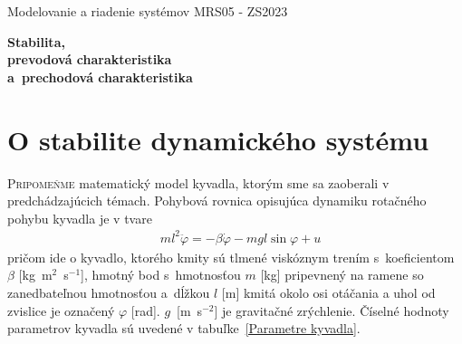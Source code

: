 \documentclass[a4paper, 10pt, ]{article}
\def\oznacenieCasti{MRS05 - ZS2023}
\begin{document}
\lstset{%
style=mystyle,
rangebeginprefix=\#\#\#\ cellB\ ,%
rangebeginsuffix=\ \#\#\#,%
rangeendprefix=\#\#\#\ cellE\ ,%
rangeendsuffix=\ \#\#\#,%
includerangemarker=false,
}




\fontsize{12pt}{22pt}\selectfont

\centerline{\textsf{Modelovanie a riadenie systémov} \hfill \textsf{\oznacenieCasti}}

\fontsize{18pt}{22pt}\selectfont






\begin{flushleft}
	\textbf{\textsf{Stabilita,\\prevodová charakteristika\\a~prechodová charakteristika}}
\end{flushleft}





\normalsize

\bigskip

{\hypersetup{hidelinks}

\tableofcontents

}

\bigskip

\vspace{18pt}





\pagebreak

\section{O stabilite dynamického systému}

\lettrine[lines=3, nindent=0pt]{P}{ripomeňme}
matematický model kyvadla, ktorým sme sa zaoberali v predchádzajúcich témach.
Pohybová rovnica opisujúca dynamiku rotačného pohybu kyvadla je v tvare
\begin{align} \label{PohRovKyvadla} %
		&ml^2 \ddot{\varphi} = -\beta \dot{\varphi} - mgl\sin{\varphi} + u
\end{align}
pričom ide o kyvadlo, ktorého kmity sú tlmené viskóznym trením s~koeficientom $\beta$ [kg~m$^2$~s$^{-1}$], hmotný bod s~hmotnosťou $m$ [kg] pripevnený na ramene so zanedbateľnou hmotnosťou a~dĺžkou $l$ [m] kmitá okolo osi otáčania a uhol od zvislice je označený $\varphi$ [rad]. $g$~[m~s$^{-2}$] je gravitačné zrýchlenie. Číselné hodnoty parametrov kyvadla sú uvedené v tabuľke~\ref{Parametre kyvadla}.
\end{document}
